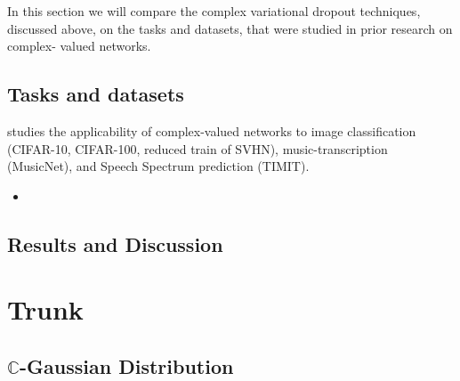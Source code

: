 \documentclass[a4paper,10pt]{article}
\newcommand{\cplx}{\mathbb{C}}
\begin{document}
In this section we will compare the complex variational dropout techniques, discussed
above, on the tasks and datasets, that were studied in prior research on complex-%
valued networks.

\subsection{Tasks and datasets} %
\label{sub:tasks_and_datasets}

\cite{trabelsi_deep_2017} studies the applicability of complex-valued networks to
image classification (CIFAR-10, CIFAR-100, reduced train of SVHN), music-transcription
(MusicNet), and Speech Spectrum prediction (TIMIT).
\begin{itemize}
  \item 
\end{itemize}


\cite{monning_evaluation_2018}
\cite{jankowski_complex-valued_1996}
\cite{amin_complex-valued_2012}
\cite{sarroff_complex_2018}


\subsection{Results and Discussion} %
\label{sub:results_and_discussion}



\section{Trunk} %
\label{sec:trunk}

\subsection{$\cplx$-Gaussian Distribution} %
\label{sub:c_gaussian_distribution}
\end{document}
